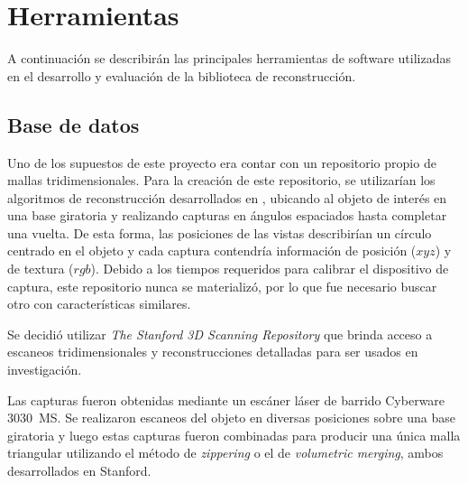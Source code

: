 \chapter{Herramientas}
A continuación se describirán las principales herramientas de software
utilizadas en el desarrollo y evaluación de la biblioteca de reconstrucción.

\section{Base de datos}
Uno de los supuestos de este proyecto era contar con un repositorio propio de
mallas tridimensionales.
Para la creación de este repositorio,
se utilizarían los algoritmos de reconstrucción desarrollados en \cite{Pancho},
ubicando al objeto de interés en una base giratoria y realizando capturas
en ángulos espaciados hasta completar una vuelta.
De esta forma, las posiciones de las vistas describirían un círculo centrado en el objeto y
cada captura contendría información de posición ($xyz$) y de textura ($rgb$).
Debido a los tiempos requeridos para calibrar el dispositivo de captura,
este repositorio nunca se materializó,
 por lo que fue necesario buscar otro con características similares.


Se decidió utilizar \emph{The Stanford 3D Scanning Repository}\cite{StanfordScanRep} que brinda
acceso a escaneos tridimensionales y reconstrucciones detalladas para ser
usados en investigación.

Las capturas fueron obtenidas mediante un escáner láser de barrido Cyberware
3030~MS.  Se realizaron escaneos del objeto en diversas posiciones sobre una
base giratoria y luego estas capturas fueron combinadas para producir una única
malla triangular utilizando el método de \emph{zippering}\cite{Turk:1994:ZPM:192161.192241} o el de
\emph{volumetric merging}\cite{Curless:1996:VMB:237170.237269}, ambos desarrollados en
Stanford.

